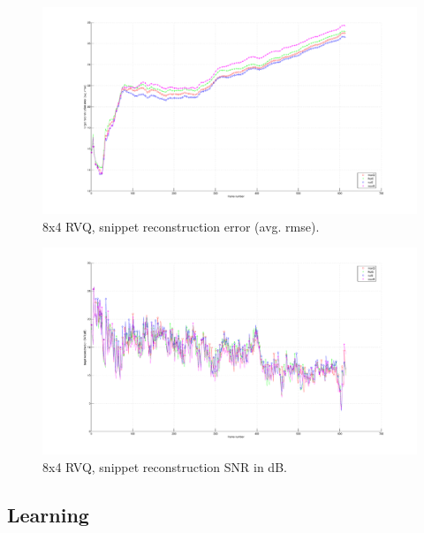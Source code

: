 								\begin{figure}[h!]
								\centering
								\includegraphics[height=0.4\textheight]{thesis/3_sylv_8_4_1000_snp_armse.pdf}
								\caption{8x4 RVQ, snippet reconstruction error (avg. rmse).}
								\label{fig:3_sylv_8_4_1000_snp_armse}
								\end{figure}

								\begin{figure}[h!]
								\centering
								\includegraphics[height=0.4\textheight]{thesis/3_sylv_8_4_1000_snp_SNRdB.pdf}
								\caption{8x4 RVQ, snippet reconstruction SNR in dB.}
								\label{fig:3_sylv_8_4_1000_snp_SNRdB}
								\end{figure}
\clearpage
\newpage
\subsection{Learning}

